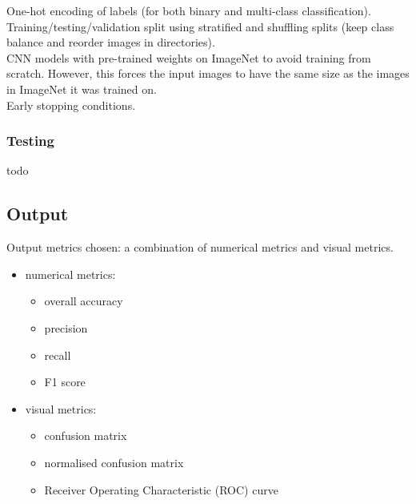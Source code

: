 One-hot encoding of labels (for both binary and multi-class classification).\\

Training/testing/validation split using stratified and shuffling splits (keep class balance and reorder images in directories).\\

CNN models with pre-trained weights on ImageNet to avoid training from scratch. However, this  forces the input images to have the same size as the images in ImageNet it was trained on.\\

Early stopping conditions.\\

\subsubsection{Testing}

todo

\subsection{Output}

Output metrics chosen: a combination of numerical metrics and visual metrics.


\begin{itemize}
    \item numerical metrics:
    \begin{itemize}
        \item overall accuracy
        \item precision
        \item recall
        \item F1 score
    \end{itemize}
    \item visual metrics:
    \begin{itemize}
        \item confusion matrix
        \item normalised confusion matrix
        \item Receiver Operating Characteristic (ROC) curve
    \end{itemize}
\end{itemize}


